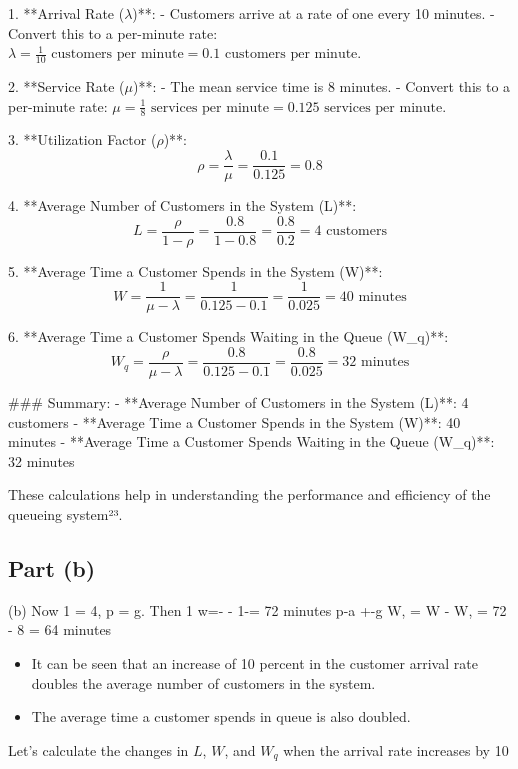 \documentclass[a4paper12pt]{article}
\begin{document}
1. **Arrival Rate (\(\lambda\))**:
   - Customers arrive at a rate of one every 10 minutes.
   - Convert this to a per-minute rate: \(\lambda = \frac{1}{10} \text{ customers per minute} = 0.1 \text{ customers per minute}\).

2. **Service Rate (\(\mu\))**:
   - The mean service time is 8 minutes.
   - Convert this to a per-minute rate: \(\mu = \frac{1}{8} \text{ services per minute} = 0.125 \text{ services per minute}\).

3. **Utilization Factor (\(\rho\))**:
   $$\rho = \frac{\lambda}{\mu} = \frac{0.1}{0.125} = 0.8$$

4. **Average Number of Customers in the System (L)**:
   $$L = \frac{\rho}{1 - \rho} = \frac{0.8}{1 - 0.8} = \frac{0.8}{0.2} = 4 \text{ customers}$$

5. **Average Time a Customer Spends in the System (W)**:
   $$W = \frac{1}{\mu - \lambda} = \frac{1}{0.125 - 0.1} = \frac{1}{0.025} = 40 \text{ minutes}$$

6. **Average Time a Customer Spends Waiting in the Queue (W_q)**:
   $$W_q = \frac{\rho}{\mu - \lambda} = \frac{0.8}{0.125 - 0.1} = \frac{0.8}{0.025} = 32 \text{ minutes}$$

### Summary:
- **Average Number of Customers in the System (L)**: 4 customers
- **Average Time a Customer Spends in the System (W)**: 40 minutes
- **Average Time a Customer Spends Waiting in the Queue (W_q)**: 32 minutes

These calculations help in understanding the performance and efficiency of the queueing system²³.


\medskip 
\subsection*{Part (b)}
(b) Now 1 = 4, p = g. Then 
1 w=- - 1-= 72 minutes 
p-a +-g 
W, = W - W, = 72 - 8 = 64 minutes 

\begin{itemize}
\item It can be seen that an increase of 10 percent in the customer arrival rate doubles the average number 
of customers in the system. 
\item The average time a customer spends in queue is also doubled.
\end{itemize}

Let's calculate the changes in \(L\), \(W\), and \(W_q\) when the arrival rate increases by 10%
\end{document}
